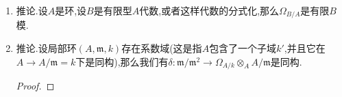 \begin{enumerate}
\begin{proof}
		描述$\delta_0$:首先$\delta^*$是把$A$模同态$\varphi:\Omega_{A/k}\to T$映射为$\varphi':\mathfrak{m}/\mathfrak{m}^2\to T$,$x+\mathfrak{m}^2\mapsto\varphi(\mathrm{d}_{A/k}x)$.于是如果$D=\varphi\circ\mathrm{d}_{A/k}\in\mathrm{Der}_k(A,T)$,那么$\delta_0(D)$是同态$x+\mathfrak{m}^2\mapsto\varphi(\mathrm{d}_{A/k}x)$,换句话讲$\delta_0(D):\mathfrak{m}/\mathfrak{m}^2\to T$就是$D:A\to T$诱导的商同态.
		
		验证正合性:
		\begin{itemize}
			\item 如果$D\in\mathrm{Der}_k(B,T)$,$\alpha_0(D)=D\circ g$,那么$D\circ g(\mathfrak{m})=0$,于是诱导的$\delta_0(\alpha_0(D))=0$.
			\item 如果$D\in\mathrm{Der}_k(A,T)$满足$\delta_0(D)=0$,此即$D(\mathfrak{m})=0$,于是$D$也可以视为$A/\mathfrak{m}=B\to T$的导数.
		\end{itemize}
		
		接下来设$B$在$k$上0-光滑,我们来证明$\delta_0$是满射.首先我们断言$0\to\mathfrak{m}/\mathfrak{m}^2\to A/\mathfrak{m}^2\to B\to0$是分裂短正合列.考虑如下实线交换图表,0-光滑保证了存在同态$s$使得如下图表交换:
		$$\xymatrix{B\ar[rr]^{1_B}\ar@{-->}[drr]^s&&B=A/\mathfrak{m}\\k\ar[u]\ar[rr]&&A/\mathfrak{m}^2\ar[u]_g}$$
		
		于是$gs=1_B$,于是$g(1_{A/\mathfrak{m}^2}-sg)=0$,但是按照$\ker g$是$A/\mathfrak{m}^2$的平方为零的理想,并且$1_{A/\mathfrak{m}^2}$和$sg$都是$g$的提升,于是$D=1-sg$是$A/\mathfrak{m}^2\to\mathfrak{m}/\mathfrak{m}^2$的导数.
		$$\xymatrix{A/\mathfrak{m}^2\ar[rr]^g&&A/\mathfrak{m}\\&&A/\mathfrak{m}^2\ar[u]_g\ar@<0.5ex>[ull]^{sg}\ar@<-0.5ex>[ull]_1}$$
		
		接下来任取$B$模同态$\psi:\mathfrak{m}/\mathfrak{m}^2\to T$.考虑复合$\xymatrix{A\ar[r]&A/\mathfrak{m}^2\ar[r]^D&\mathfrak{m}/\mathfrak{m}^2\ar[r]^{\psi}&T}$,记作$D'$,这是$\mathrm{Der}_k(A,T)$中的导数.我们断言有$\delta^*(D')=\psi$,因为$\delta^*D'(\overline{x})=D'(x)=\psi(D(\overline{x}))=\psi(\overline{x}-sg(\overline{x}))=\psi(\overline{x})$.
	\end{proof}
    \item 推论.设$A$是环,设$B$是有限型$A$代数,或者这样代数的分式化,那么$\Omega_{B/A}$是有限$B$模.
    \item 推论.设局部环$(A,\mathfrak{m},k)$存在系数域(这是指$A$包含了一个子域$k'$,并且它在$A\to A/\mathfrak{m}=k$下是同构),那么我们有$\delta:\mathfrak{m}/\mathfrak{m}^2\to\Omega_{A/k}\otimes_AA/\mathfrak{m}$是同构.
    \begin{proof}
    	

\end{proof}
\end{enumerate}
